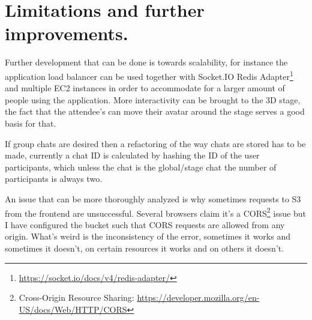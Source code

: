 \chapter{Limitations and further improvements.}

Further development that can be done is towards scalability, for instance the application load balancer can be used together with Socket.IO Redis Adapter\footnote{\href{https://socket.io/docs/v4/redis-adapter/}{https://socket.io/docs/v4/redis-adapter/}} and multiple EC2 instances in order to accommodate for a larger amount of people using the application. More interactivity can be brought to the 3D stage, the fact that the attendee's can move their avatar around the stage serves a good basis for that.

If group chats are desired then a refactoring of the way chats are stored has to be made, currently a chat ID is calculated by hashing the ID of the user participants, which unless the chat is the global/stage chat the number of participants is always two.

An issue that can be more thoroughly analyzed is why sometimes requests to S3 from the frontend are unsuccessful. Several browsers claim it's a CORS\footnote{Cross-Origin Resource Sharing: \href{https://developer.mozilla.org/en-US/docs/Web/HTTP/CORS}{https://developer.mozilla.org/en-US/docs/Web/HTTP/CORS}} issue but I have configured the bucket such that CORS requests are allowed from any origin. What's weird is the inconsistency of the error, sometimes it works and sometimes it doesn't, on certain resources it works and on others it doesn't.